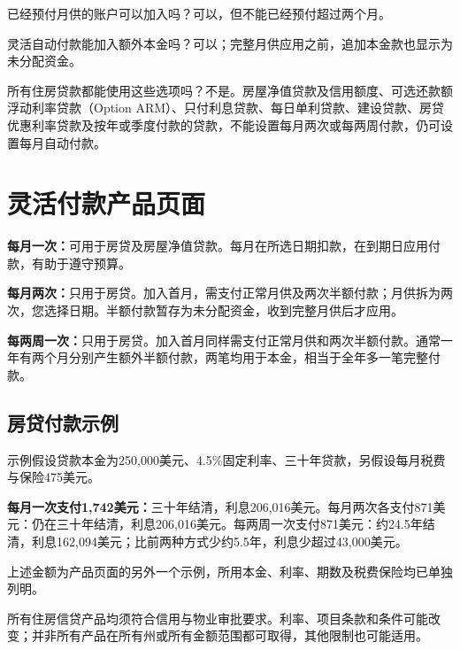 \documentclass[UTF8,fontset=none,11pt,a4paper]{ctexart}
\begin{document}
已经预付月供的账户可以加入吗？可以，但不能已经预付超\allowbreak\mbox{过两个月。}


灵活自动付款能加入额外本金吗？可以；完整月供应用之前，追加本金款也显示为未\allowbreak\mbox{分配资金。}


所有住房贷款都能使用这些选项吗？不是。房屋净值贷款及信用额度、可选还款额浮动利率贷款（Option ARM）、只付利息贷款、每日单利贷款、建设贷款、房贷优惠利率贷款及按年或季度付款的贷款，不能设置每月两次或每两周付款，仍可设置每月自\allowbreak\mbox{动付款。}


\section*{灵活付款产品页面}
\textbf{每月一次：}可用于房贷及房屋净值贷款。每月在所选日期扣款，在到期日应用付款，有助于遵\allowbreak\mbox{守预算。}


\textbf{每月两次：}只用于房贷。加入首月，需支付正常月供及两次半额付款；月供拆为两次，您选择日期。半额付款暂存为未分配资金，收到完整月供\allowbreak\mbox{后才应用。}


\textbf{每两周一次：}只用于房贷。加入首月同样需支付正常月供和两次半额付款。通常一年有两个月分别产生额外半额付款，两笔均用于本金，相当于全年多一笔\allowbreak\mbox{完整付款。}


\subsection*{房贷付款示例}
示例假设贷款本金为250,000美元、4.5\%固定利率、三十年贷款，另假设每月税费与保险\allowbreak\mbox{475美元。}


\textbf{每月一次支付1,742美元：}三十年结清，利息206,016美元。每月两次各支付871美元：仍在三十年结清，利息206,016美元。每两周一次支付871美元：约24.5年结清，利息162,094美元；比前两种方式少约5.5年，利息少超过43,000美元。


上述金额为产品页面的另外一个示例，所用本金、利率、期数及税费保险均已\allowbreak\mbox{单独列明。}


所有住房信贷产品均须符合信用与物业审批要求。利率、项目条款和条件可能改变；并非所有产品在所有州或所有金额范围都可取得，其他限制也\allowbreak\mbox{可能适用。}
\end{document}
